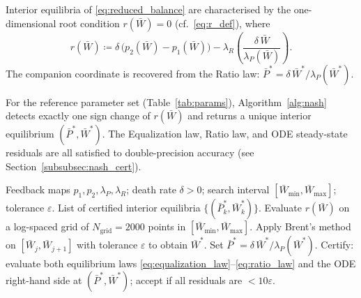 \documentclass[pdflatex,sn-mathphys-ay]{sn-jnl}
\theoremstyle{thmstyleone}
\theoremstyle{definition}
\theoremstyle{remark}
\begin{document}
Interior equilibria of \eqref{eq:reduced_balance} are characterised by the one-dimensional
root condition $r(\bar W)=0$ (cf.\ \eqref{eq:r_def}), where
\begin{equation}\label{eq:num_r_algo}
r(\bar W) \coloneqq \delta\,\bigl(p_2(\bar W)-p_1(\bar W)\bigr)
- \lambda_R\!\left(\frac{\delta\,\bar W}{\lambda_P(\bar W)}\right).
\end{equation}
The companion coordinate is recovered from the Ratio law:
$\bar P^* = \delta\,\bar W^*/\lambda_P(\bar W^*)$.

For the reference parameter set (Table~\ref{tab:params}), Algorithm~\ref{alg:nash}
detects exactly one sign change of $r(\bar W)$ and returns a unique interior equilibrium
$(\bar P^*,\bar W^*)$.
The Equalization law, Ratio law, and ODE steady-state residuals are all satisfied to
double-precision accuracy
(see Section~\ref{subsubsec:nash_cert}).

\begin{algorithm}[H]
\caption{Bracket-and-refine Nash solver}\label{alg:nash}
\begin{algorithmic}[1]
\Require Feedback maps $p_1,p_2,\lambda_P,\lambda_R$; death rate $\delta>0$;
         search interval $[\bar W_{\min},\bar W_{\max}]$; tolerance $\varepsilon$.
\Ensure  List of certified interior equilibria $\{(\bar P^*_k,\bar W^*_k)\}$.
\State Evaluate $r(\bar W)$ on a log-spaced grid of $N_{\mathrm{grid}}=2000$ points in
       $[\bar W_{\min},\bar W_{\max}]$.
  \State Apply Brent's method on $[\bar W_j,\bar W_{j+1}]$ with tolerance $\varepsilon$ to
         obtain $\bar W^*$.
  \State Set $\bar P^*=\delta\,\bar W^*/\lambda_P(\bar W^*)$.
  \State Certify: evaluate both equilibrium laws \eqref{eq:equalization_law}--\eqref{eq:ratio_law}
         and the ODE right-hand side at $(\bar P^*,\bar W^*)$; accept if all residuals are
         $<10\varepsilon$.
\EndFor
\end{algorithmic}
\end{algorithm}
\end{document}
